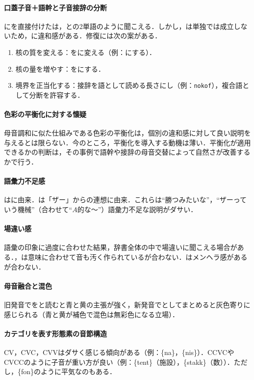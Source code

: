 \documentclass[../../main-detail.tex]{subfiles}
\begin{document}
\paragraph{口蓋子音＋語幹と子音接辞の分断} にを直接付けたは，との2単語のように聞こえる．しかし，は単独では成立しないため，に違和感がある．修復には次の案がある．
\begin{enumerate}
    \item 核の質を変える：をに変える（例：にする）．
    \item 核の量を増やす：をにする．
    \item 境界を正当化する：接辞を語として読める長さにし（例：\texttt{nokof}），複合語として分断を許容する．
\end{enumerate}

\paragraph{色彩の平衡化に対する懐疑} 母音調和に似た仕組みである色彩の平衡化は，個別の違和感に対して良い説明を与えるとは限らない．今のところ，平衡化を導入する動機は薄い．平衡化が適用できるかの判断は，その事例で語幹や接辞の母音交替によって自然さが改善するかで行う．

\paragraph{語彙力不足感} はに由来．は「ザー」からの連想に由来．これらは``勝つみたいな''，``ザーっていう機械''（合わせて``$A$的な〜''）語彙力不足な説明がダサい．

\paragraph{場違い感} 語彙の印象に過度に合わせた結果，辞書全体の中で場違いに聞こえる場合がある．，は意味に合わせて音も汚く作られているが合わない．はメンヘラ感があるが合わない．

\paragraph{母音融合と混色} 旧発音でを\textipa{[ea]}と読むと青と黄の主張が強く，新発音で\textipa{[\ae]}としてまとめると灰色寄りに感じられる（青と黄が補色で混色は無彩色になる立場）．

\paragraph{カテゴリを表す形態素の音節構造} CV，CVC，CVVはダサく感じる傾向がある（例：\{na\}，\{nis\}）．CCVCやCVCCのように子音が重い方が良い（例：\{tent\}（施設），\{stakk\}（数））．ただし，\{fon\}のように平気なのもある．
\end{document}
